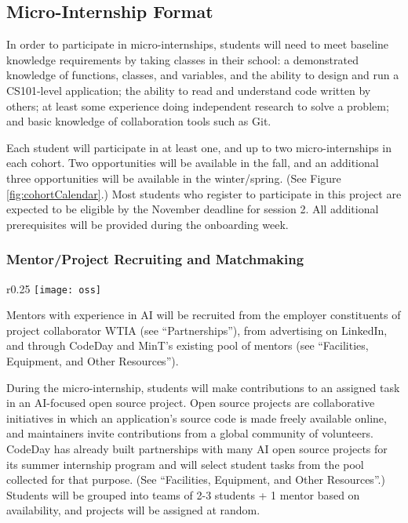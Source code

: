 \subsection{Micro-Internship Format}

In order to participate in micro-internships, students will need to meet baseline knowledge requirements by taking classes in their school: a demonstrated knowledge of functions, classes, and variables, and the ability to design and run a CS101-level application; the ability to read and understand code written by others; at least some experience doing independent research to solve a problem; and basic knowledge of collaboration tools such as Git.

Each student will participate in at least one, and up to two micro-internships in each cohort. Two opportunities will be available in the fall, and an additional three opportunities will be available in the winter/spring. (See Figure \ref{fig:cohortCalendar}.) Most students who register to participate in this project are expected to be eligible by the November deadline for session 2. All additional prerequisites will be provided during the onboarding week.

\subsubsection{Mentor/Project Recruiting and Matchmaking}

\begin{wrapfigure}{r}{0.25\textwidth} %
    \centering
    \texttt{[image: oss]}
\end{wrapfigure}

Mentors with experience in AI will be recruited from the employer constituents of project collaborator WTIA (see ``Partnerships''), from advertising on LinkedIn, and through CodeDay and MinT's existing pool of mentors (see ``Facilities, Equipment, and Other Resources'').

During the micro-internship, students will make contributions to an assigned task in an AI-focused open source project. Open source projects are collaborative initiatives in which an application's source code is made freely available online, and maintainers invite contributions from a global community of volunteers. CodeDay has already built partnerships with many AI open source projects for its summer internship program\cite{menezesOpenSourceInternshipsIndustry} and will select student tasks from the pool collected for that purpose. (See ``Facilities, Equipment, and Other Resources''.) Students will be grouped into teams of 2-3 students + 1 mentor based on availability, and projects will be assigned at random.

